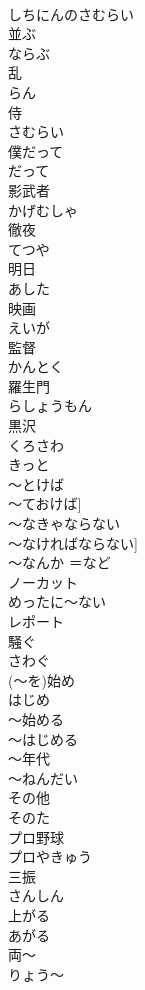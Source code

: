 \documentclass[8pt]{extreport}
\begin{document}
\begin{CJK}{UTF8}{min}
\\	しちにんのさむらい
\\	並ぶ	
\\	ならぶ
\\	乱	
\\	らん
\\	侍	
\\	さむらい
\\	僕だって	
\\	だって
\\	影武者	
\\	かげむしゃ
\\	徹夜	
\\	てつや
\\	明日	
\\	あした
\\	映画	
\\	えいが
\\	監督	
\\	かんとく
\\	羅生門	
\\	らしょうもん
\\	黒沢	
\\	くろさわ
\\	きっと	
\\	～とけば	
\\	～ておけば]	
\\	～なきゃならない	
\\	～なければならない]	
\\	～なんか	＝など	
\\	ノーカット	
\\	めったに～ない	
\\	レポート	
\\	騒ぐ	
\\	さわぐ
\\	(～を)始め	
\\	はじめ
\\	～始める	
\\	～はじめる
\\	～年代	
\\	～ねんだい
\\	その他	
\\	そのた
\\	プロ野球	
\\	プロやきゅう
\\	三振	
\\	さんしん
\\	上がる	
\\	あがる
\\	両～	
\\	りょう～

\end{CJK}
\end{document}
